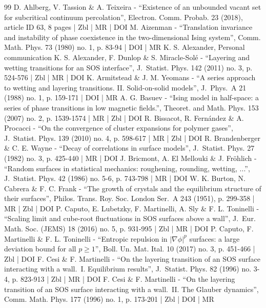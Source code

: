 \begin{thebibliography}{99}
D. Ahlberg, V. Tassion \& A. Teixeira - “Existence of an unbounded vacant set for subcritical continuum percolation”, Electron. Comm. Probab. 23 (2018), article ID 63, 8 pages | Zbl | MR | DOI
M. Aizenman - “Translation invariance and instability of phase coexistence in the two-dimensional Ising system”, Comm. Math. Phys. 73 (1980) no. 1, p. 83-94 | DOI | MR
K. S. Alexander, Personal communication
K. S. Alexander, F. Dunlop \& S. Miracle-Solé - “Layering and wetting transitions for an SOS interface”, J. Statist. Phys. 142 (2011) no. 3, p. 524-576 | Zbl | MR | DOI
K. Armitstead \& J. M. Yeomans - “A series approach to wetting and layering transitions. II. Solid-on-solid models”, J. Phys. A 21 (1988) no. 1, p. 159-171 | DOI | MR
A. G. Basuev - “Ising model in half-space: a series of phase transitions in low magnetic fields.”, Theoret. and Math. Phys. 153 (2007) no. 2, p. 1539-1574 | MR | Zbl | DOI
R. Bissacot, R. Fernández \& A. Procacci - “On the convergence of cluster expansions for polymer gases”, J. Statist. Phys. 139 (2010) no. 4, p. 598-617 | MR | Zbl | DOI
R. Brandenberger \& C. E. Wayne - “Decay of correlations in surface models”, J. Statist. Phys. 27 (1982) no. 3, p. 425-440 | MR | DOI
J. Bricmont, A. El Mellouki \& J. Fröhlich - “Random surfaces in statistical mechanics: roughening, rounding, wetting, ...”, J. Statist. Phys. 42 (1986) no. 5-6, p. 743-798 | MR | DOI
W. K. Burton, N. Cabrera \& F. C. Frank - “The growth of crystals and the equilibrium structure of their surfaces”, Philos. Trans. Roy. Soc. London Ser. A 243 (1951), p. 299-358 | MR | Zbl | DOI
P. Caputo, E. Lubetzky, F. Martinelli, A. Sly \& F. L. Toninelli - “Scaling limit and cube-root fluctuations in SOS surfaces above a wall”, J. Eur. Math. Soc. (JEMS) 18 (2016) no. 5, p. 931-995 | Zbl | MR | DOI
P. Caputo, F. Martinelli \& F. L. Toninelli - “Entropic repulsion in $|\nabla \phi |^p$ surfaces: a large deviation bound for all $p\ge 1$”, Boll. Un. Mat. Ital. 10 (2017) no. 3, p. 451-466 | Zbl | DOI
F. Cesi \& F. Martinelli - “On the layering transition of an SOS surface interacting with a wall. I. Equilibrium results”, J. Statist. Phys. 82 (1996) no. 3-4, p. 823-913 | Zbl | MR | DOI
F. Cesi \& F. Martinelli - “On the layering transition of an SOS surface interacting with a wall. II. The Glauber dynamics”, Comm. Math. Phys. 177 (1996) no. 1, p. 173-201 | Zbl | DOI | MR

\end{thebibliography}
